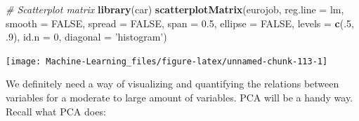 \documentclass[]{book}
\newenvironment{Shaded}{\begin{snugshade}}{\end{snugshade}}
\newcommand{\KeywordTok}[1]{\textcolor[rgb]{0.13,0.29,0.53}{\textbf{#1}}}
\newcommand{\DataTypeTok}[1]{\textcolor[rgb]{0.13,0.29,0.53}{#1}}
\newcommand{\DecValTok}[1]{\textcolor[rgb]{0.00,0.00,0.81}{#1}}
\newcommand{\FloatTok}[1]{\textcolor[rgb]{0.00,0.00,0.81}{#1}}
\newcommand{\StringTok}[1]{\textcolor[rgb]{0.31,0.60,0.02}{#1}}
\newcommand{\CommentTok}[1]{\textcolor[rgb]{0.56,0.35,0.01}{\textit{#1}}}
\newcommand{\OtherTok}[1]{\textcolor[rgb]{0.56,0.35,0.01}{#1}}
\newcommand{\NormalTok}[1]{#1}
\begin{document}
\begin{Shaded}
\begin{Highlighting}[]
\CommentTok{# Scatterplot matrix}
\KeywordTok{library}\NormalTok{(car)}
\KeywordTok{scatterplotMatrix}\NormalTok{(eurojob, }\DataTypeTok{reg.line =}\NormalTok{ lm, }\DataTypeTok{smooth =} \OtherTok{FALSE}\NormalTok{, }\DataTypeTok{spread =} \OtherTok{FALSE}\NormalTok{,}
                  \DataTypeTok{span =} \FloatTok{0.5}\NormalTok{, }\DataTypeTok{ellipse =} \OtherTok{FALSE}\NormalTok{, }\DataTypeTok{levels =} \KeywordTok{c}\NormalTok{(.}\DecValTok{5}\NormalTok{, .}\DecValTok{9}\NormalTok{), }\DataTypeTok{id.n =} \DecValTok{0}\NormalTok{,}
                  \DataTypeTok{diagonal =} \StringTok{'histogram'}\NormalTok{)}
\end{Highlighting}
\end{Shaded}

\begin{center}\texttt{[image: Machine-Learning\_files/figure-latex/unnamed-chunk-113-1]} \end{center}

We definitely need a way of visualizing and quantifying the relations
between variables for a moderate to large amount of variables. PCA will
be a handy way. Recall what PCA does:
\end{document}
